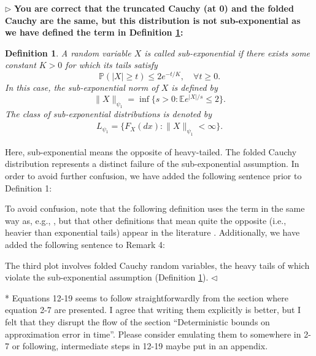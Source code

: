 \documentclass[12pt]{article}
\makeatletter
\newenvironment{reply}{$\triangleright$\bfseries}{$\triangleleft$}
\renewenvironment{quote}
               {\list{}{\rightmargin\leftmargin}%
                \item\relax\normalfont}
               {\endlist}
\newtheorem{@definition}{\bf Definition}
\newenvironment{definition}{\begin{@definition}\rm}{\end{@definition}}
\makeatother
\begin{document}
\newcommand{\bbP}{{\mathbb P}}
\newcommand{\bbE}{{\mathbb E}}
\begin{reply}
	You are correct that the truncated Cauchy (at 0) and the folded Cauchy are the same, but this distribution is not sub-exponential as we have defined the term in Definition \ref{def:sub:exp:RV}:
	\begin{quote}
		
\setcounter{equation}{39}
\begin{definition}
	\label{def:sub:exp:RV}
	A random variable $X$ is called \textit{sub-exponential} if there
	exists some constant $K > 0$ for which its tails satisfy
	\begin{equation}\label{e:def_subexp_RV}
		\bbP(|X|\geq t) \leq 2 e^{-t/K}, \quad \forall t \geq 0.
	\end{equation}
	In this case, the \textit{sub-exponential norm} of $X$ is defined by
	\begin{equation}\label{e:sub-exp_norm}
		\|X\|_{\psi_1} = \inf\big\{s > 0: \bbE e^{|X|/s} \leq 2\big\}.
	\end{equation}
	The \textit{class of sub-exponential distributions} is denoted by
	\begin{align*}
		L_{\psi_1} = \big\{F_X(dx): \|X\|_{\psi_1} < \infty \big\}.
	\end{align*}
\end{definition}
	\end{quote}
Here, sub-exponential means the opposite of heavy-tailed.  The folded Cauchy distribution represents a distinct failure of the sub-exponential assumption.  In order to avoid further confusion, we have added the following sentence prior to Definition 1:
\begin{quote}
	To avoid confusion, note that the following definition uses the term in the same way as, e.g., \cite{vershynin:2018}, but that other definitions that mean quite the opposite (i.e., heavier than exponential tails) appear in the literature \citep{goldie1998subexponential}.
\end{quote}
Additionally, we have added the following sentence to Remark 4:
\begin{quote}
	The third plot involves folded Cauchy random variables, the heavy tails of which violate the sub-exponential assumption (Definition \ref{def:sub:exp:RV}).
\end{quote}
\end{reply}	

* Equations 12-19 seems to follow straightforwardly from the section where equation 2-7 are presented. I agree that writing them explicitly is better, but I felt that they disrupt the flow of the section ``Deterministic bounds on approximation error in time''. Please consider emulating them to somewhere in 2-7 or following, intermediate steps in 12-19 maybe put in an appendix. 
\end{document}
